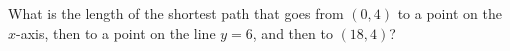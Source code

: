 What is the length of the shortest path that goes from $(0,4)$ to a point on the $x$-axis, then to a point on the line $y=6$, and then to $(18,4)$?
